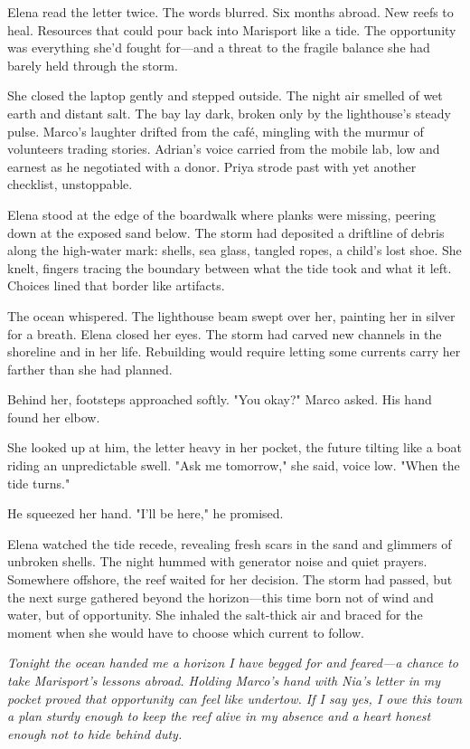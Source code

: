 Elena read the letter twice. The words blurred. Six months abroad. New reefs to heal. Resources that could pour back into Marisport like a tide. The opportunity was everything she'd fought for—and a threat to the fragile balance she had barely held through the storm.

She closed the laptop gently and stepped outside. The night air smelled of wet earth and distant salt. The bay lay dark, broken only by the lighthouse's steady pulse. Marco's laughter drifted from the café, mingling with the murmur of volunteers trading stories. Adrian's voice carried from the mobile lab, low and earnest as he negotiated with a donor. Priya strode past with yet another checklist, unstoppable.

Elena stood at the edge of the boardwalk where planks were missing, peering down at the exposed sand below. The storm had deposited a driftline of debris along the high-water mark: shells, sea glass, tangled ropes, a child's lost shoe. She knelt, fingers tracing the boundary between what the tide took and what it left. Choices lined that border like artifacts.

The ocean whispered. The lighthouse beam swept over her, painting her in silver for a breath. Elena closed her eyes. The storm had carved new channels in the shoreline and in her life. Rebuilding would require letting some currents carry her farther than she had planned.

Behind her, footsteps approached softly. "You okay?" Marco asked. His hand found her elbow.

She looked up at him, the letter heavy in her pocket, the future tilting like a boat riding an unpredictable swell. "Ask me tomorrow," she said, voice low. "When the tide turns."

He squeezed her hand. "I'll be here," he promised.

Elena watched the tide recede, revealing fresh scars in the sand and glimmers of unbroken shells. The night hummed with generator noise and quiet prayers. Somewhere offshore, the reef waited for her decision. The storm had passed, but the next surge gathered beyond the horizon—this time born not of wind and water, but of opportunity. She inhaled the salt-thick air and braced for the moment when she would have to choose which current to follow.

\noindent\textit{Tonight the ocean handed me a horizon I have begged for and feared—a chance to take Marisport's lessons abroad. Holding Marco's hand with Nia's letter in my pocket proved that opportunity can feel like undertow. If I say yes, I owe this town a plan sturdy enough to keep the reef alive in my absence and a heart honest enough not to hide behind duty.}
